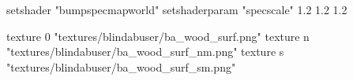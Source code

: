 		setshader "bumpspecmapworld"
		setshaderparam "specscale" 1.2 1.2 1.2

		texture 0 "textures/blindabuser/ba_wood_surf.png"
		texture n "textures/blindabuser/ba_wood_surf_nm.png"
		texture s "textures/blindabuser/ba_wood_surf_sm.png"
